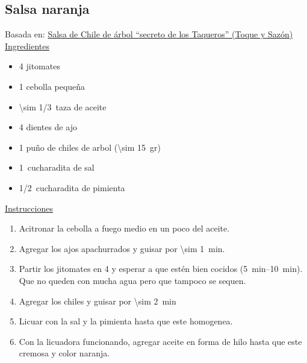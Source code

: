 \subsection{Salsa naranja}

Basada en: \href{https://www.youtube.com/watch?v=k9JAnBb19W8}{Salsa de Chile de árbol “secreto de los Taqueros” (Toque y Sazón)}\\

\underline{Ingredientes}
\begin{itemize}
\item 4 jitomates
\item 1 cebolla pequeña
\item \SI{\sim 1/3}{taza} de aceite
\item 4 dientes de ajo
\item 1 puño de chiles de arbol (\SI{\sim 15}{gr})
\item \SI{1}{cucharadita} de sal
\item \SI{1/2}{cucharadita} de pimienta
\end{itemize}

\underline{Instrucciones}
\begin{enumerate}
\item Acitronar la cebolla a fuego medio en un poco del aceite.
\item Agregar los ajos apachurrados y guisar por \SI{\sim 1}{min}.
\item Partir los jitomates en 4 y esperar a que estén bien cocidos  (\SIrange{5}{10}{min}). Que no queden con mucha agua pero que tampoco se sequen.
\item Agregar los chiles y guisar por  \SI{\sim 2}{min}
\item Licuar con la sal y la pimienta hasta que este homogenea.
\item Con la licuadora funcionando, agregar aceite en forma de hilo hasta que este cremosa y color naranja.
\end{enumerate}